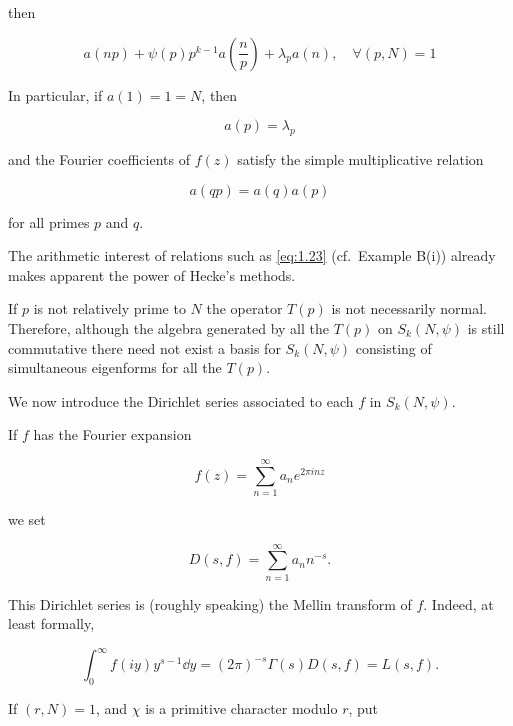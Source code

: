 then

\begin{equation}\label{eq:1.21}
a(np) + \psi(p) p^{k-1} a\!\left(\frac{n}{p}\right) + \lambda_p a(n), \quad \forall (p,N) = 1\tag{1.21}
\end{equation}

In particular, if $a(1) = 1 = N$, then

\begin{equation}\label{eq:1.22}
a(p) = \lambda_p\tag{1.22}
\end{equation}

and the Fourier coefficients of $f(z)$ satisfy the simple multiplicative relation

\begin{equation}\label{eq:1.23}
a(qp) = a(q) a(p)\tag{1.23}
\end{equation}

for all primes $p$ and $q$.

The arithmetic interest of relations such as \eqref{eq:1.23} (cf.\ Example B(i)) already makes apparent the power of Hecke's methods.

\begin{remark}\label{rem:1.8}

If $p$ is not relatively prime to $N$ the operator $T(p)$ is not necessarily normal. Therefore, although the algebra generated by all the $T(p)$ on $S_k(N,\psi)$ is still commutative there need not exist a basis for $S_k(N,\psi)$ consisting of simultaneous eigenforms for all the $T(p)$.

\end{remark}

We now introduce the Dirichlet series associated to each $f$ in $S_k(N,\psi)$.

If $f$ has the Fourier expansion

\[
f(z) = \sum_{n=1}^{\infty} a_n e^{2\pi inz}
\]

we set

\[
D(s,f) = \sum_{n=1}^{\infty} a_n n^{-s}.
\]

This Dirichlet series is (roughly speaking) the Mellin transform of $f$. Indeed, at least formally,

\begin{equation}\label{eq:1.24}
\int_0^{\infty} f(iy) y^{s-1} \dd y = (2\pi)^{-s} \Gamma(s) D(s,f) = L(s,f).\tag{1.24}
\end{equation}

If $(r,N) = 1$, and $\chi$ is a primitive character modulo $r$, put

